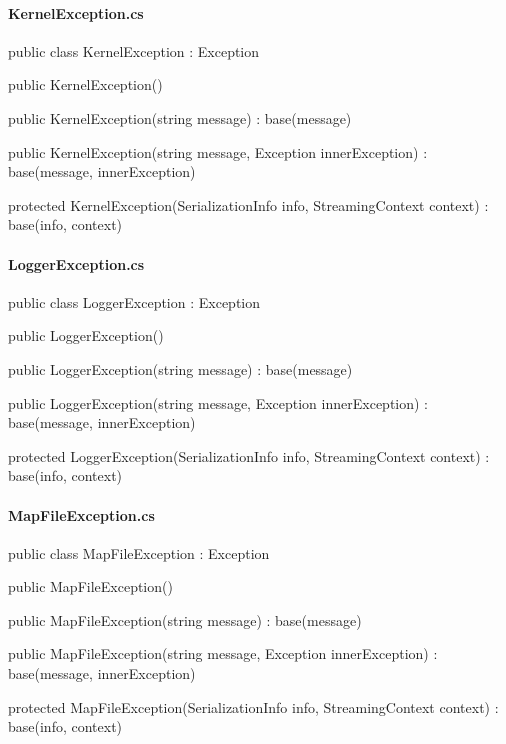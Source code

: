 \begin{flushleft}
    \paragraph{KernelException.cs}
    \begin{cscode}
[Serializable]
public class KernelException : Exception
{
    public KernelException()
    {
    }

    public KernelException(string message) : base(message)
    {
    }

    public KernelException(string message, Exception innerException) : base(message, innerException)
    {
    }

    protected KernelException(SerializationInfo info, StreamingContext context) : base(info, context)
    {
    }
}
    \end{cscode}
\pagebreak
    
    \paragraph{LoggerException.cs}
    \begin{cscode}
[Serializable]
public class LoggerException : Exception
{
    public LoggerException()
    {
    }

    public LoggerException(string message) : base(message)
    {
    }

    public LoggerException(string message, Exception innerException) : base(message, innerException)
    {
    }

    protected LoggerException(SerializationInfo info, StreamingContext context) : base(info, context)
    {
    }
}
    \end{cscode}
\pagebreak
    
    \paragraph{MapFileException.cs}
    \begin{cscode}
[Serializable]
public class MapFileException : Exception
{
    public MapFileException()
    {
    }

    public MapFileException(string message) : base(message)
    {
    }

    public MapFileException(string message, Exception innerException) : base(message, innerException)
    {
    }

    protected MapFileException(SerializationInfo info, StreamingContext context) : base(info, context)
    {
    }
}
    \end{cscode}
\pagebreak
    

\end{flushleft}
